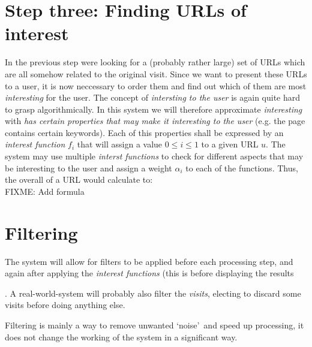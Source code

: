 \documentclass[a4paper]{danarticle}
\begin{document}
{  \section{Step three: Finding URLs of interest}
    In the previous step were looking for a (probably rather large)
    set of URLs which are all somehow related to the original visit.
    Since we want to present these URLs to a user, it is now 
    neccessary to order them and find out which of them are most
    \textit{interesting} for the user. 
    The concept of \textit{intersting to the user} is again quite 
    hard to grasp algorithmically. In this system we will therefore
    approximate \textit{interesting} with \textit{has certain
    properties that may make it interesting to the user} (e.g.
    the page contains certain keywords). Each of this properties
    shall be expressed by an \textit{interest function} $ f_i $ 
    that will assign a value $ 0 \leq i \leq 1 $ to a given URL
    $ u $. The system may use multiple \textit{interst functions}
    to check for different aspects that may be interesting
    to the user and assign a weight $ \alpha_{i} $ to each 
    of the functions. Thus, the overall 
    of a URL would calculate to:
    \\ FIXME: Add formula
  
  \section{Filtering}
    The system will allow for filters to be applied before each
    processing step, and again after applying the 
    \textit{interest functions} (this is before displaying the
    results}. A real-world-system will probably also filter 
    the \textit{visits}, electing to discard some visits before
    doing anything else.
    
    Filtering is mainly a way to remove unwanted \lq noise\rq\ and
    speed up processing, it does not change the working of the
    system in a significant way.
\end{document}
